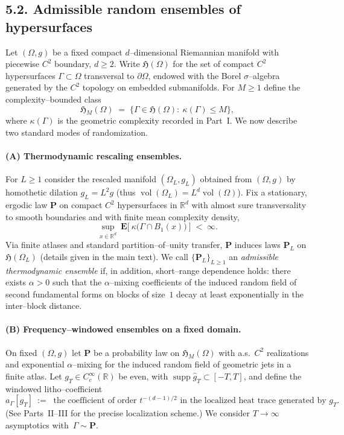 \subsection*{5.2. Admissible random ensembles of hypersurfaces}
Let $(\Omega,g)$ be a fixed compact $d$–dimensional Riemannian manifold with piecewise $C^2$ boundary, $d\ge2$. Write $\mathfrak{H}(\Omega)$ for the set of compact $C^2$ hypersurfaces $\Gamma\subset\Omega$ transversal to $\partial\Omega$, endowed with the Borel $\sigma$–algebra generated by the $C^2$ topology on embedded submanifolds. For $M\ge1$ define the complexity–bounded class
\[
\mathfrak{H}_M(\Omega)\;=\;\{\Gamma\in\mathfrak{H}(\Omega):\ \kappa(\Gamma)\le M\},
\]
where $\kappa(\Gamma)$ is the geometric complexity recorded in Part~I. We now describe two standard modes of randomization.

\paragraph{(A) Thermodynamic rescaling ensembles.}
For $L\ge1$ consider the rescaled manifold $(\Omega_L,g_L)$ obtained from $(\Omega,g)$ by homothetic dilation $g_L = L^2 g$ (thus $\operatorname{vol}(\Omega_L)=L^d\operatorname{vol}(\Omega)$). Fix a stationary, ergodic law $\mathbf{P}$ on compact $C^2$ hypersurfaces in $\mathbb{R}^d$ with almost sure transversality to smooth boundaries and with finite mean complexity density,
\[
\sup_{x\in\mathbb{R}^d}\ \mathbf{E}\Big[\ \kappa\big(\Gamma\cap B_1(x)\big)\ \Big]\;<\;\infty.
\]
Via finite atlases and standard partition–of–unity transfer, $\mathbf{P}$ induces laws $\mathbf{P}_L$ on $\mathfrak{H}(\Omega_L)$ (details given in the main text). We call $\{\mathbf{P}_L\}_{L\ge1}$ an \emph{admissible thermodynamic ensemble} if, in addition, short–range dependence holds:
there exists $\alpha>0$ such that the $\alpha$–mixing coefficients of the induced random field of second fundamental forms on blocks of size~$1$ decay at least exponentially in the inter–block distance.

\paragraph{(B) Frequency–windowed ensembles on a fixed domain.}
On fixed $(\Omega,g)$ let $\mathbf{P}$ be a probability law on $\mathfrak{H}_M(\Omega)$ with a.s.\ $C^2$ realizations and exponential $\alpha$–mixing for the induced random field of geometric jets in a finite atlas. Let $g_T\in C_c^\infty(\mathbb{R})$ be even, with $\operatorname{supp}\widehat g_T\subset[-T,T]$, and define the windowed litho–coefficient
\[
a_\Gamma[g_T]\ :=\ \text{ the coefficient of order }t^{-(d-1)/2}\text{ in the localized heat trace generated by }g_T.
\]
(See Parts~II–III for the precise localization scheme.) We consider $T\to\infty$ asymptotics with~$\Gamma\sim\mathbf{P}$.

